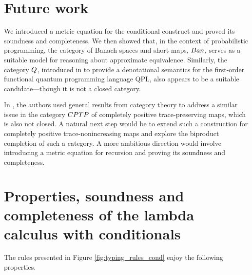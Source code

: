 \documentclass[a4paper,UKenglish,cleveref, autoref, thm-restate]{lipics-v2021}
\begin{document}
%
%
%

 \section{Future work}

We introduced a metric equation for the conditional construct and proved its soundness and completeness. We then showed that, in the context of probabilistic programming, the category of Banach spaces and short maps, $\catBan$, serves as a suitable model for reasoning about approximate equivalence. Similarly, the category $\catQ$, introduced in \cite{selinger04} to provide a denotational semantics for the first-order functional quantum programming language QPL, also appears to be a suitable candidate—though it is not a closed category.


In \cite{dahlqvist2023syntactic}, the authors used general results from category theory to address a similar issue in the category $\catCPTP$ of completely positive trace-preserving maps, which is also not closed. A natural next step would be to extend such a construction for completely positive trace-nonincreasing maps and explore the biproduct completion of such a category. A more ambitious direction would involve introducing a metric equation for recursion and proving its soundness and completeness.



\appendix

\section{Properties, soundness and completeness of  the lambda calculus with conditionals}\label{appendix:sound_comp_cond}
The rules presented in Figure \ref{fig:typing_rules_cond} enjoy the following
properties.
\end{document}
